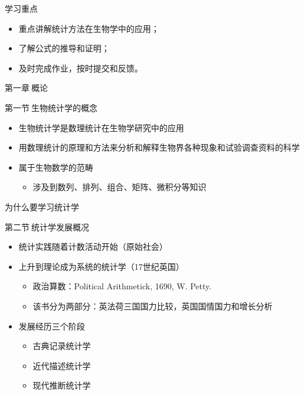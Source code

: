 \documentclass[
  10pt,
  ignorenonframetext,
]{beamer}
\providecommand{\tightlist}{%
  \setlength{\itemsep}{0pt}\setlength{\parskip}{0pt}}
\begin{document}
\begin{frame}{学习重点}
\protect\hypertarget{ux5b66ux4e60ux91cdux70b9}{}
\begin{itemize}
\tightlist
\item
  重点讲解统计方法在生物学中的应用；
\item
  了解公式的推导和证明；
\item
  及时完成作业，按时提交和反馈。
\end{itemize}
\end{frame}

\begin{frame}{}
\protect\hypertarget{section-1}{}
\LARGE 第一章\(~\)概论
\end{frame}

\begin{frame}{第一节\(~\)生物统计学的概念}
\protect\hypertarget{ux7b2cux4e00ux8282ux751fux7269ux7edfux8ba1ux5b66ux7684ux6982ux5ff5}{}
\begin{itemize}
\item
  生物统计学是数理统计在生物学研究中的应用
\item
  用数理统计的原理和方法来分析和解释生物界各种现象和试验调查资料的科学
\item
  属于生物数学的范畴

  \begin{itemize}
  \tightlist
  \item
    涉及到数列、排列、组合、矩阵、微积分等知识
  \end{itemize}
\end{itemize}
\end{frame}

\begin{frame}{为什么要学习统计学}
\protect\hypertarget{ux4e3aux4ec0ux4e48ux8981ux5b66ux4e60ux7edfux8ba1ux5b66}{}
\end{frame}

\begin{frame}{第二节\(~\)统计学发展概况}
\protect\hypertarget{ux7b2cux4e8cux8282ux7edfux8ba1ux5b66ux53d1ux5c55ux6982ux51b5}{}
\begin{itemize}
\item
  统计实践随着计数活动开始（原始社会）
\item
  上升到理论成为系统的统计学（17世纪英国）

  \begin{itemize}
  \tightlist
  \item
    政治算数：Political Arithmetick, 1690, W. Petty.
  \item
    该书分为两部分：英法荷三国国力比较，英国国情国力和增长分析
  \end{itemize}
\item
  发展经历三个阶段

  \begin{itemize}
  \tightlist
  \item
    古典记录统计学
  \item
    近代描述统计学
  \item
    现代推断统计学
  \end{itemize}
\end{itemize}
\end{frame}
\end{document}
